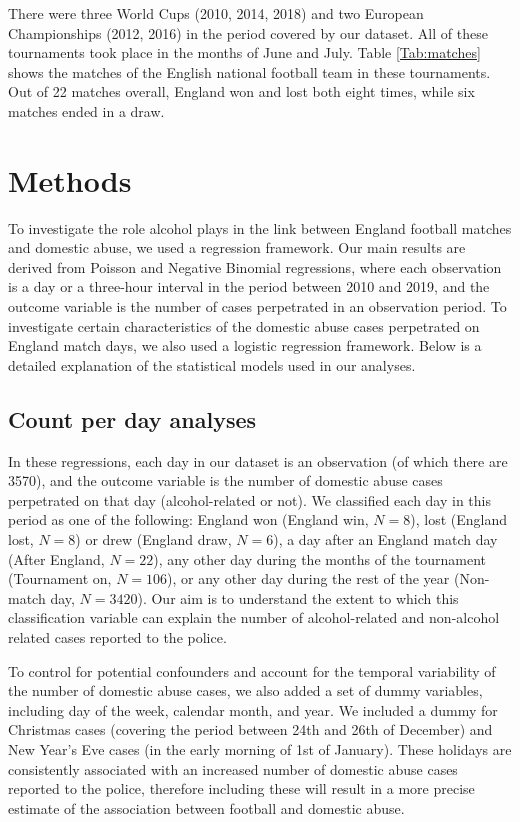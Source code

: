 \documentclass[12pt, a4paper]{article}
\begin{document}
 There were three World Cups (2010, 2014, 2018) and two European Championships (2012, 2016) in the period covered by our dataset. All of these tournaments took place in the months of June and July. 
Table \ref{Tab:matches} shows the matches of the English national football team in these tournaments. Out of 22 matches overall, England won and lost both eight times, while six matches ended in a draw. 

\section{Methods}

To investigate the role alcohol plays in the link between England football matches and domestic abuse, we used a regression framework. Our main results are derived from Poisson and Negative Binomial regressions, where each observation is a day or a three-hour interval in the period between 2010 and 2019, and the outcome variable is the number of cases perpetrated in an observation period. To investigate certain characteristics of the domestic abuse cases perpetrated on England match days, we also used a logistic regression framework. Below is a detailed explanation of the statistical models used in our analyses.  


\subsection{Count per day analyses} 
\label{modelsexplained}


In these regressions, each day in our dataset is an observation (of which there are 3570), and the outcome variable is the number of domestic abuse cases perpetrated on that day (alcohol-related or not). We classified each day in this period as one of the following: England won (England win, $N = 8$), lost (England lost, $N = 8$) or drew (England draw, $N = 6$), a day after an England match day (After England, $N = 22$), any other day during the months of the tournament (Tournament on, $N = 106$), or any other day during the rest of the year (Non-match day, $N = 3420$). Our aim is to understand the extent to which this classification variable can explain the number of alcohol-related and non-alcohol related cases reported to the police.

To control for potential confounders and account for the temporal variability of the number of domestic abuse cases, we also added a set of dummy  variables, including day of the week, calendar month, and year. 
We included a dummy for Christmas cases (covering the period between 24th and 26th of December) and New Year's Eve cases (in the early morning of 1st of January). 
These holidays are consistently associated with an increased number of domestic abuse cases reported to the police, therefore including these will result in a more precise estimate of the association between football and domestic abuse.
\end{document}
